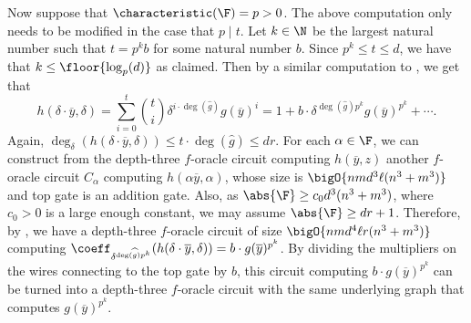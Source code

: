 \documentclass[letterpaper, 11pt]{amsart}
\begin{document}
\begin{pf}
    Now suppose that $\characteristic(\F) = p > 0$.
    The above computation only needs to be modified in the case that $p \mid t$.
    Let $k \in \N$ be the largest natural number such that $t = p^k b$ for some natural number $b$.
    Since $p^k \leq t \leq d$, we have that $k \leq \floor{\log_p(d)}$ as claimed.
    Then by a similar computation to , we get that
    \begin{equation}\label{eq:det_computation_char_p} 
        h(\delta \cdot \overline{y}, \delta) = \sum_{i = 0}^t \binom{t}{i} \delta^{i \cdot \deg(\widehat{g})} g(\overline{y})^i = 1 + b \cdot \delta^{\deg(\widehat{g}) p^k} g(\overline{y})^{p^k} + \cdots.
    \end{equation}
    Again, $\deg_\delta(h(\delta \cdot \overline{y}, \delta)) \leq t \cdot \deg(\widehat{g}) \leq dr$.
    For each $\alpha \in \F$, we can construct from the depth-three $f$-oracle circuit computing $h(\overline{y},z)$ another $f$-oracle circuit $C_\alpha$ computing $h(\alpha \overline{y}, \alpha)$, whose size is $\bigO{nmd^3\ell(n^3+m^3)}$ and top gate is an addition gate.
    Also, as $\abs{\F} \geq c_0 d^3(n^3+m^3)$, where $c_0>0$ is a large enough constant, we may assume $\abs{\F} \geq dr+1$.
    Therefore, by , we have a depth-three $f$-oracle circuit of size $\bigO{nmd^4\ell r(n^3+m^3)}$ computing $\coeff_{\delta^{\deg(\widehat{g})p^k}}(h(\delta\cdot \overline{y},\delta))=b\cdot g(\overline{y})^{p^k}$.
    By dividing the multipliers on the wires connecting to the top gate by $b$, this circuit computing $b\cdot g(\overline{y})^{p^k}$ can be turned into a depth-three $f$-oracle circuit with the same underlying graph that computes $g(\overline{y})^{p^k}$.
\end{pf}
\end{document}
